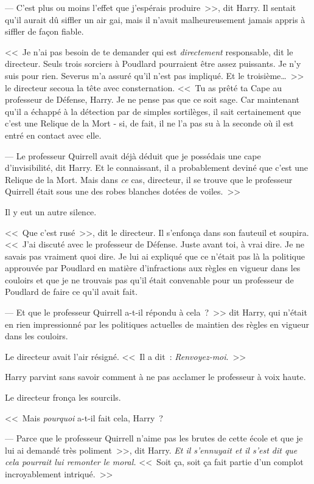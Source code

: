 --- C'est plus ou moins l'effet que j'espérais produire~>>, dit Harry. Il sentait qu'il aurait dû siffler un air gai, mais il n'avait malheureusement jamais appris à siffler de façon fiable.

<<~Je n'ai pas besoin de te demander qui est \emph{directement} responsable, dit le directeur. Seuls trois sorciers à Poudlard pourraient être assez puissants. Je n'y suis pour rien. Severus m'a assuré qu'il n'est pas impliqué. Et le troisième…~>> le directeur secoua la tête avec consternation. <<~Tu as prêté ta Cape au professeur de Défense, Harry. Je ne pense pas que ce soit sage. Car maintenant qu'il a échappé à la détection par de simples sortilèges, il sait certainement que c'est une Relique de la Mort - si, de fait, il ne l'a pas su à la seconde où il est entré en contact avec elle.

--- Le professeur Quirrell avait déjà déduit que je possédais une cape d'invisibilité, dit Harry. Et le connaissant, il a probablement deviné que c'est une Relique de la Mort. Mais dans \emph{ce} cas, directeur, il se trouve que le professeur Quirrell était sous une des robes blanches dotées de voiles.~>>

Il y eut un autre silence.

<<~Que c'est rusé~>>, dit le directeur. Il s'enfonça dans son fauteuil et soupira. <<~J'ai discuté avec le professeur de Défense. Juste avant toi, à vrai dire. Je ne savais pas vraiment quoi dire. Je lui ai expliqué que ce n'était pas là la politique approuvée par Poudlard en matière d'infractions aux règles en vigueur dans les couloirs et que je ne trouvais pas qu'il était convenable pour un professeur de Poudlard de faire ce qu'il avait fait.

--- Et que le professeur Quirrell a-t-il répondu à cela~?~>> dit Harry, qui n'était en rien impressionné par les politiques actuelles de maintien des règles en vigueur dans les couloirs.

Le directeur avait l'air résigné. <<~Il a dit~: \emph{Renvoyez-moi}.~>>

Harry parvint sans savoir comment à ne pas acclamer le professeur à voix haute.

Le directeur fronça les sourcils.

<<~Mais \emph{pourquoi} a-t-il fait cela, Harry~?

--- Parce que le professeur Quirrell n'aime pas les brutes de cette école et que je lui ai demandé très poliment~>>, dit Harry. \emph{Et il s'ennuyait et il s'est dit que cela pourrait lui remonter le moral.} <<~Soit ça, soit ça fait partie d'un complot incroyablement intriqué.~>>

